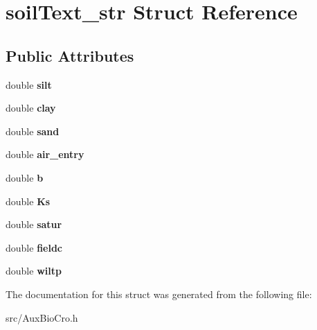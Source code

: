 \hypertarget{structsoil_text__str}{\section{soil\-Text\-\_\-str Struct Reference}
\label{structsoil_text__str}
}
\subsection*{Public Attributes}
\begin{DoxyCompactItemize}
\item 
\hypertarget{structsoil_text__str_a2f92b9054369175170b1abdeaaffd9b1}{double {\bfseries silt}}\label{structsoil_text__str_a2f92b9054369175170b1abdeaaffd9b1}

\item 
\hypertarget{structsoil_text__str_ab9de8d87d14b8c4a584c797d82a42c4d}{double {\bfseries clay}}\label{structsoil_text__str_ab9de8d87d14b8c4a584c797d82a42c4d}

\item 
\hypertarget{structsoil_text__str_a7dc7fd46c11d906de403e9c70fbbfb2e}{double {\bfseries sand}}\label{structsoil_text__str_a7dc7fd46c11d906de403e9c70fbbfb2e}

\item 
\hypertarget{structsoil_text__str_aa74442f8f046cf1910f5cb2068ae4826}{double {\bfseries air\-\_\-entry}}\label{structsoil_text__str_aa74442f8f046cf1910f5cb2068ae4826}

\item 
\hypertarget{structsoil_text__str_a9f0dd6c1c9e40596ec066617c7e6d866}{double {\bfseries b}}\label{structsoil_text__str_a9f0dd6c1c9e40596ec066617c7e6d866}

\item 
\hypertarget{structsoil_text__str_aec48ce21a2510c2a5a0381643951aa52}{double {\bfseries Ks}}\label{structsoil_text__str_aec48ce21a2510c2a5a0381643951aa52}

\item 
\hypertarget{structsoil_text__str_a5448f507e6f5753bb03efbdac6c5141d}{double {\bfseries satur}}\label{structsoil_text__str_a5448f507e6f5753bb03efbdac6c5141d}

\item 
\hypertarget{structsoil_text__str_a6406e1f0b3a117ec9e660334f2c8c005}{double {\bfseries fieldc}}\label{structsoil_text__str_a6406e1f0b3a117ec9e660334f2c8c005}

\item 
\hypertarget{structsoil_text__str_ad551cdc0abed8eccedd0446b1048f0e1}{double {\bfseries wiltp}}\label{structsoil_text__str_ad551cdc0abed8eccedd0446b1048f0e1}

\end{DoxyCompactItemize}


The documentation for this struct was generated from the following file\-:\begin{DoxyCompactItemize}
\item 
src/Aux\-Bio\-Cro.\-h\end{DoxyCompactItemize}
